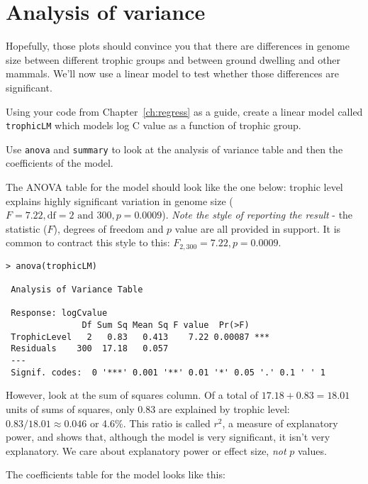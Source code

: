 \section{Analysis of variance}

Hopefully, those plots should convince you that there are differences 
in genome size between different trophic groups and between ground 
dwelling and other mammals. We'll now use a linear model to test 
whether those differences are significant.

\begin{compactitem}[$\quad\star$]
	\item Using your code from Chapter~\ref{ch:regress} as a guide, 
	create a linear model called {\tt trophicLM} which models log C value 
	as a function of trophic group.
	\item Use {\tt anova} and  {\tt summary} to look at the analysis of 
	variance table and then the coefficients of the model. 
\end{compactitem}

The ANOVA table for the model should look like the one below: trophic 
level explains highly significant variation in genome size ($F= 7.22, 
\textrm{df}=2 \textrm{ and } 300, p =0.0009$). {\it Note the style of 
reporting the result} - the statistic ($F$), degrees of freedom and $p$ 
value are all provided in support. It is common to contract this style 
to this: $F_{2,300}=7.22, p=0.0009$. 
\begin{lstlisting}
> anova(trophicLM)
 
 Analysis of Variance Table
 
 Response: logCvalue
               Df Sum Sq Mean Sq F value  Pr(>F)    
 TrophicLevel   2   0.83   0.413    7.22 0.00087 ***
 Residuals    300  17.18   0.057                    
 ---
 Signif. codes:  0 '***' 0.001 '**' 0.01 '*' 0.05 '.' 0.1 ' ' 1 

\end{lstlisting}

However, look at the sum of squares column. Of a total of $17.18+0.83 = 
18.01$ units of sums of squares, only 0.83 are explained by trophic 
level: $0.83/18.01 \approx 0.046$ or 4.6\%. This ratio is called 
$r^2$, a measure of explanatory power, and shows that, although the 
model is very significant, it isn't very explanatory. We  care about 
explanatory power or effect size, {\it not} $p$ values.
  
The coefficients table for the model looks like this:

